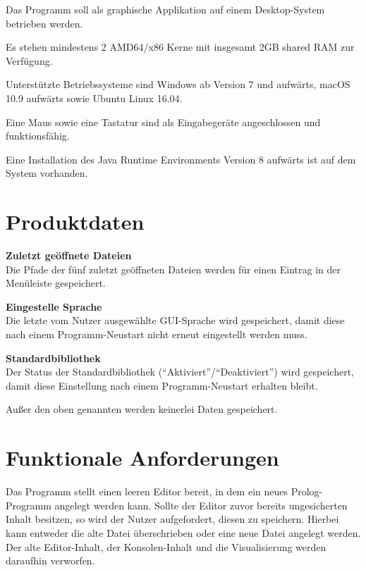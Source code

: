 \documentclass[parskip=full,11pt,twoside]{scrartcl}
\begin{document}
Das Programm soll als graphische Applikation auf einem Desktop-System betrieben werden.

Es stehen mindestens 2 AMD64/x86 Kerne mit insgesamt 2GB shared RAM zur Verfügung.

Unterstützte Betriebssysteme sind Windows ab Version 7 und aufwärts, macOS 10.9 aufwärts sowie Ubuntu Linux 16.04.

Eine Maus sowie eine Tastatur sind als Eingabegeräte angeschlossen und funktionsfähig.

Eine Installation des Java Runtime Environments Version 8 aufwärts ist auf dem System vorhanden.

\section{Produktdaten}

\textbf{Zuletzt geöffnete Dateien} \\
Die Pfade der fünf zuletzt geöffneten Dateien werden für einen Eintrag in der Menüleiste gespeichert.

\textbf{Eingestelle Sprache} \\
Die letzte vom Nutzer ausgewählte GUI-Sprache wird gespeichert, damit diese nach einem Programm-Neustart nicht erneut eingestellt werden muss.

\textbf{Standardbibliothek} \\
Der Status der Standardbibliothek (``Aktiviert''/``Deaktiviert'') wird gespeichert, damit diese Einstellung nach einem Programm-Neustart erhalten bleibt.

Außer den oben genannten werden keinerlei Daten gespeichert.

\section{Funktionale Anforderungen}


Das Programm stellt einen leeren Editor bereit, in dem ein neues Prolog-Programm angelegt werden kann. Sollte der Editor zuvor bereits ungesicherten Inhalt besitzen, so wird der Nutzer aufgefordert, diesen zu speichern. Hierbei kann entweder die alte Datei überschrieben oder eine neue Datei angelegt werden. Der alte Editor-Inhalt, der Konsolen-Inhalt und die Visualisierung werden daraufhin verworfen. 

\end{document}
